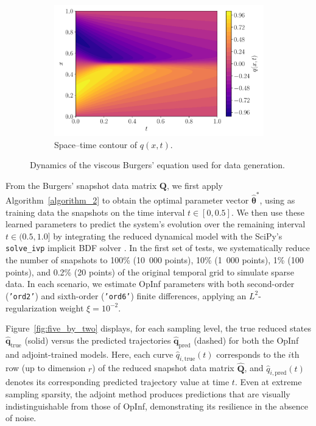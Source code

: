 \begin{figure}[h!]
\begin{subfigure}[t]{0.5\textwidth}
    \includegraphics[width=\textwidth]{figures/heatmap_001.pdf}
    \caption{Space–time contour of \(q(x,t)\).}
    \label{fig:burgers-contour}
  \end{subfigure}
  \caption{Dynamics of the viscous Burgers’ equation used for data generation.}
  \label{fig:burgers-data}
\end{figure}
From the Burgers’ snapshot data matrix $\mathbf{Q}$, we first apply Algorithm~\ref{algorithm_2} to obtain the optimal parameter vector $\hat{\bm{\theta}}^*$, using as training data the snapshots on the time interval $t\in[0,0.5]$. We then use these learned parameters to predict the system’s evolution over the remaining interval $t\in(0.5,1.0]$ by integrating the reduced dynamical model with the SciPy's \texttt{solve\_ivp} implicit BDF solver \cite{scipy-solveivp}. In the first set of tests, we systematically reduce the number of snapshots to 100\% (10~000 points), 10\% (1~000 points), 1\% (100 points), and 0.2\% (20 points) of the original temporal grid to simulate sparse data. In each scenario, we estimate OpInf parameters with both second-order (\texttt{'ord2'}) and sixth-order (\texttt{'ord6'}) finite differences, applying an $L^2$-regularization weight $\xi=10^{-2}$.  

Figure~\ref{fig:five_by_two} displays, for each sampling level, the true reduced states $\hat{\mathbf{q}}_{\mathrm{true}}$ (solid) versus the predicted trajectories $\hat{\mathbf{q}}_{\mathrm{pred}}$ (dashed) for both the OpInf and adjoint-trained models.  Here, each curve $\hat{q}_{i,\mathrm{true}}(t)$ corresponds to the $i$th row (up to dimension $r$) of the reduced snapshot data matrix $\hat{\mathbf{Q}}$, and $\hat{q}_{i,\mathrm{pred}}(t)$ denotes its corresponding predicted trajectory value at time $t$. Even at extreme sampling sparsity, the adjoint method produces predictions that are visually indistinguishable from those of OpInf, demonstrating its resilience in the absence of noise.

